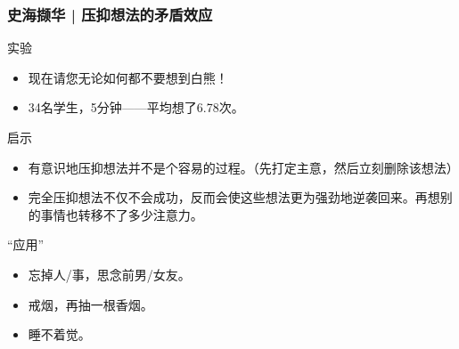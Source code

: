 \begin{frame}
  \frametitle{史海撷华 | 压抑想法的矛盾效应}
  \begin{block}{实验}
    \begin{itemize}
      \item 现在请您无论如何都不要想到白熊！
      \item 34名学生，5分钟——平均想了6.78次。
    \end{itemize}
  \end{block}
  \vspace{-0.3em}
  \pause
  \begin{block}{启示}
    \begin{itemize}
      \item 有意识地压抑想法并不是个容易的过程。（先打定主意，然后立刻删除该想法）
      \item 完全压抑想法不仅不会成功，反而会使这些想法更为强劲地逆袭回来。再想别的事情也转移不了多少注意力。
    \end{itemize}
  \end{block}
  \vspace{-0.3em}
  \pause
  \begin{block}{“应用”}
    \begin{itemize}
      \item 忘掉人/事，思念前男/女友。
      \item 戒烟，再抽一根香烟。
      \item 睡不着觉。
    \end{itemize}
  \end{block}
\end{frame}

